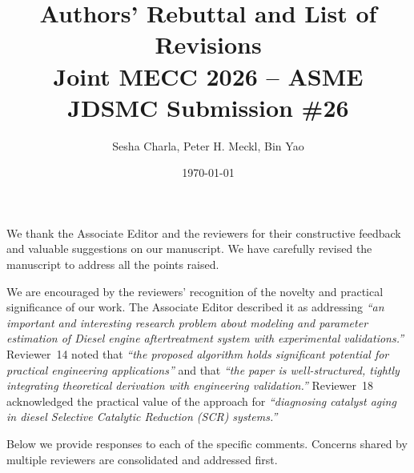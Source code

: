 \documentclass[letterpaper, 10pt]{article}
\title{Authors' Rebuttal and List of Revisions \\ \large Joint MECC 2026 -- ASME JDSMC Submission \#26}
\author{Sesha Charla, Peter H. Meckl, Bin Yao}
\date{\today}
\begin{document}
\maketitle

We thank the Associate Editor and the reviewers for their constructive feedback and valuable suggestions on our
manuscript. We have carefully revised the manuscript to address all the points raised.

We are encouraged by the reviewers' recognition of the novelty and practical significance of our work. The Associate
Editor described it as addressing \emph{``an important and interesting research problem about modeling and parameter
    estimation of Diesel engine aftertreatment system with experimental validations.''} Reviewer~14 noted that \emph{``the
    proposed algorithm holds significant potential for practical engineering applications''} and that \emph{``the paper is
    well-structured, tightly integrating theoretical derivation with engineering validation.''} Reviewer~18 acknowledged
the practical value of the approach for \emph{``diagnosing catalyst aging in diesel Selective Catalytic Reduction (SCR)
    systems.''}

Below we provide responses to each of the specific comments. Concerns shared by multiple reviewers are
consolidated and addressed first.

\bigskip
\end{document}
